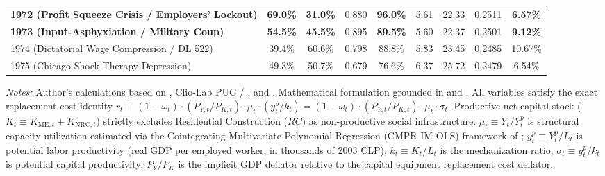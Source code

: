 \begin{table}[htbp]
{\begin{tabular}{lcccccccc}
\textbf{1972 (Profit Squeeze Crisis / Employers' Lockout)} & \textbf{69.0\%} & \textbf{31.0\%} & 0.880 & \textbf{96.0\%} & 5.61 & 22.33 & 0.2511 & \textbf{6.57\%} \\
\textbf{1973 (Input-Asphyxiation / Military Coup)} & \textbf{54.5\%} & \textbf{45.5\%} & 0.895 & \textbf{89.5\%} & 5.60 & 22.37 & 0.2501 & \textbf{9.12\%} \\
1974 (Dictatorial Wage Compression / DL 522) & 39.4\% & 60.6\% & 0.798 & 88.8\% & 5.83 & 23.45 & 0.2485 & 10.67\% \\
1975 (Chicago Shock Therapy Depression) & 49.3\% & 50.7\% & 0.679 & 76.6\% & 6.37 & 25.72 & 0.2479 & 6.54\% \\
\bottomrule
\end{tabular}%
}
\begin{minipage}{0.98\textwidth}
\vspace{0.4em}
\footnotesize
\textit{Notes:} Author's calculations based on \citet{Astorga2023}, Clio-Lab PUC / \citet{DiazLudersWagner2016}, and \citet{Polanco2026}. Mathematical formulation grounded in \citet[Section 6.1, Eqs.~28--31]{Basu2017} and \citet{Weisskopf1978,Weisskopf1979}. All variables satisfy the exact replacement-cost identity $r_t \equiv (1 - \omega_t) \cdot (P_{Y, t} / P_{K, t}) \cdot \mu_t \cdot (y^p_t / k_t) = (1 - \omega_t) \cdot (P_{Y, t} / P_{K, t}) \cdot \mu_t \cdot \sigma_t$. Productive net capital stock ($K_t \equiv K_{\text{ME}, t} + K_{\text{NRC}, t}$) strictly excludes Residential Construction ($RC$) as non-productive social infrastructure. $\mu_t \equiv Y_t / Y^p_t$ is structural capacity utilization estimated via the Cointegrating Multivariate Polynomial Regression (CMPR IM-OLS) framework of \citet{Polanco2026}; $y^p_t \equiv Y^p_t / L_t$ is potential labor productivity (real GDP per employed worker, in thousands of 2003 CLP); $k_t \equiv K_t / L_t$ is the mechanization ratio; $\sigma_t \equiv y^p_t / k_t$ is potential capital productivity; $P_Y / P_K$ is the implicit GDP deflator relative to the capital equipment replacement cost deflator.
\end{minipage}
\end{table}

